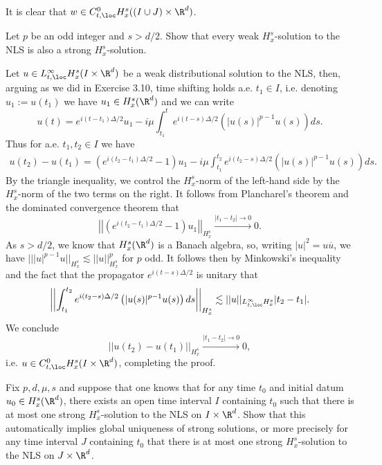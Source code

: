 \begin{solution}
	It is clear that $w \in C^0_{t, \loc} H^s_x ((I \cup J) \times \R^d)$. 
\end{solution}

\begin{statement}
	Let $p$ be an odd integer and $s > d/2$. Show that every weak $H^s_x$-solution to the NLS is also a strong $H^s_x$-solution. 
\end{statement}

\begin{solution}
	Let $u \in L^\infty_{t, \loc} H^s_x (I \times \R^d)$ be a weak distributional solution to the NLS, then, arguing as we did in Exercise 3.10, time shifting holds a.e. $t_1 \in I$, i.e. denoting $u_1 := u(t_1)$ we have $u_1 \in H^s_x (\R^d)$ and we can write
		\[ u(t) = e^{i (t - t_1) \Delta/2} u_1 - i \mu \int_{t_1}^t e^{i (t - s) \Delta/2} \left( |u (s)|^{p - 1} u(s) \right) ds. \]
	Thus for a.e. $t_1, t_2 \in I$ we have
		\begin{align*}
			u(t_2) - u(t_1) = \left(e^{i (t_2 - t_1) \Delta/2} - 1\right) u_1 - i \mu  \int_{t_1}^{t_2} e^{i (t_2 - s) \Delta/2} \left( |u(s)|^{p - 1} u(s)  \right)ds.
		\end{align*}
	By the triangle inequality, we control the $H^s_x$-norm of the left-hand side by the $H^s_x$-norm of the two terms on the right. It follows from Plancharel's theorem and the dominated convergence theorem that 
		\[ \left| \left| \left(e^{i (t_2 - t_1) \Delta/2} - 1\right) u_1 \right| \right|_{H^s_x} \overset{|t_1 - t_2| \to 0}{\longrightarrow} 0. \]
	As $s > d/2$, we know that $H^s_x (\R^d)$ is a Banach algebra, so, writing $|u|^2 = u \overline u$, we have $|| |u|^{p - 1} u||_{H^s_x} \lesssim || u||_{H^s_x}^p$ for $p$ odd. It follows then by Minkowski's inequality and the fact that the propagator $e^{i (t -s)\Delta/2}$ is unitary that 
		\[ \left|\left| \int_{t_1}^{t_2} e^{i (t_2 - s) \Delta/2} \left( |u(s)|^{p - 1} u(s)  \right)ds \right|\right|_{H^s_x} \lesssim ||u||_{L^\infty_{t, \loc} H^s_x} |t_2 - t_1|. \]
	We conclude
		\[ ||u(t_2) - u(t_1)||_{H^s_x} \overset{|t_1 - t_2| \to 0}{\longrightarrow} 0, \]
	i.e. $u \in C^0_{t, \loc} H^s_x (I \times \R^d)$, completing the proof. 		
\end{solution}

\begin{statement}
	Fix $p, d, \mu, s$ and suppose that one knows that for any time $t_0$ and initial datum $u_0 \in H^s_x (\R^d)$, there exists an open time interval $I$ containing $t_0$ such that there is at most one strong $H^s_x$-solution to the NLS on $I \times \R^d$. Show that this automatically implies global uniqueness of strong solutions, or more precisely for any time interval $J$ containing $t_0$ that there is at most one strong $H^s_x$-solution to the NLS on $J \times \R^d$. 
\end{statement}

